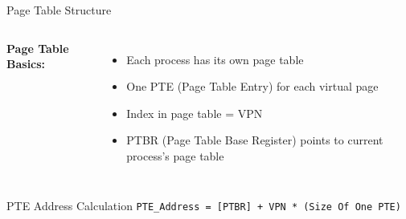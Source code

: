 \documentclass[aspectratio=169,12pt]{beamer}
\begin{document}
\begin{frame}{Page Table Structure}
\begin{columns}
\textbf{Page Table Basics:}
\begin{itemize}
\item Each process has its own page table
\item One PTE (Page Table Entry) for each virtual page
\item Index in page table = VPN
\item PTBR (Page Table Base Register) points to current process's page table
\end{itemize}

\end{columns}

\vspace{0.5cm}
\begin{block}{PTE Address Calculation}
\texttt{PTE\_Address = [PTBR] + VPN * (Size Of One PTE)}
\end{block}
\end{frame}
\end{document}
